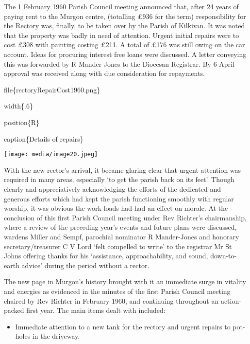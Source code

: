 The 1 February 1960 Parish Council meeting announced that, after 24
years of paying rent to the Murgon centre, (totalling £936 for the term)
responsibility for the Rectory was, finally, to be taken over by the
Parish of Kilkivan. It was noted that the property was badly in need of
attention. Urgent initial repairs were to cost £308 with painting
costing £211. A total of £176 was still owing on the car account. Ideas
for procuring interest free loans were discussed. A letter conveying
this was forwarded by R Mander Jones to the Diocesan Registrar. By 6
April approval was received along with due consideration for repayments.

file\{rectoryRepairCost1960.png\}

width\{.6\}

position\{R\}

caption\{Details of repairs\}

\texttt{[image: media/image20.jpeg]}

With the new rector's arrival, it became glaring clear that urgent
attention was required in many areas, especially `to get the parish back
on its feet'. Though clearly and appreciatively acknowledging the
efforts of the dedicated and generous efforts which had kept the parish
functioning smoothly with regular worship, it was obvious the work-loads
had had an effect on morale. At the conclusion of this first Parish
Council meeting under Rev Richter's chairmanship, where a review of the
preceding year's events and future plans were discussed, wardens Miller
and Sempf, parochial nominator R Mander-Jones and honorary
secretary/treasurer C V Lord `felt compelled to write' to the registrar
Mr St Johns offering thanks for his `assistance, approachability, and
sound, down-to-earth advice' during the period without a rector.

The new page in Murgon's history brought with it an immediate surge in
vitality and energies as evidenced in the minutes of the first Parish
Council meeting chaired by Rev Richter in February 1960, and continuing
throughout an action-packed first year. The main items dealt with
included:

\begin{itemize}
\item
  Immediate attention to a new tank for the rectory and urgent repairs
  to pot-holes in the driveway.
\end{itemize}

